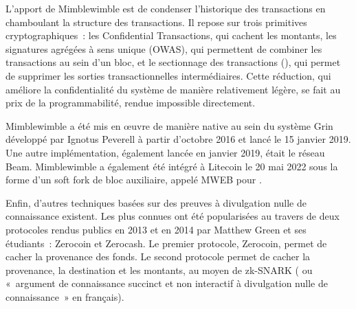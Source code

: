 L'apport de Mimblewimble est de condenser l'historique des transactions en chamboulant la structure des transactions. Il repose sur trois primitives cryptographiques~: les Confidential Transactions, qui cachent les montants, les signatures agrégées à sens unique (OWAS), qui permettent de combiner les transactions au sein d'un bloc, et le sectionnage des transactions (), qui permet de supprimer les sorties transactionnelles intermédiaires. Cette réduction, qui améliore la confidentialité du système de manière relativement légère, se fait au prix de la programmabilité, rendue impossible directement.

Mimblewimble a été mis en œuvre de manière native au sein du système Grin développé par Ignotus Peverell à partir d'octobre 2016 et lancé le 15 janvier 2019. Une autre implémentation, également lancée en janvier 2019, était le réseau Beam. Mimblewimble a également été intégré à Litecoin le 20 mai 2022 sous la forme d'un soft fork de bloc auxiliaire, appelé MWEB pour . %


Enfin, d'autres techniques basées sur des preuves à divulgation nulle de connaissance existent. Les plus connues ont été popularisées au travers de deux protocoles rendus publics en 2013 et en 2014 par Matthew Green et ses étudiants~: Zerocoin et Zerocash. Le premier protocole, Zerocoin, permet de cacher la provenance des fonds. Le second protocole permet de cacher la provenance, la destination et les montants, au moyen de zk-SNARK ( ou «~argument de connaissance succinct et non interactif à divulgation nulle de connaissance~» en français).

